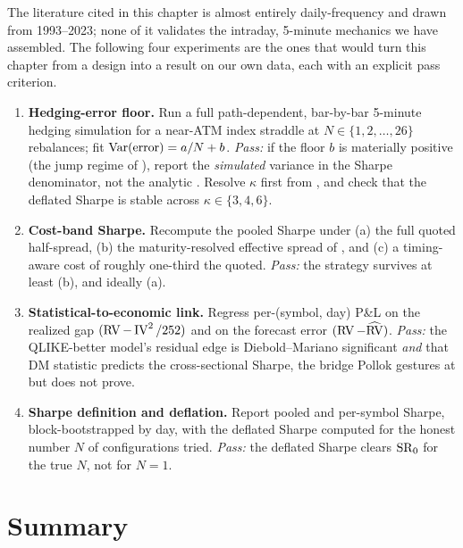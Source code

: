 The literature cited in this chapter is almost entirely daily-frequency and drawn from 1993--2023; none of it validates the intraday, 5-minute mechanics we have assembled. The following four experiments are the ones that would turn this chapter from a design into a result on our own data, each with an explicit pass criterion.

\begin{projectconnection}
\begin{enumerate}
  \item \textbf{Hedging-error floor.} Run a full path-dependent, bar-by-bar 5-minute hedging simulation for a near-ATM index straddle at $N \in \{1, 2, \dots, 26\}$ rebalances; fit $\operatorname{Var}(\text{error}) = a/N + b$. \emph{Pass:} if the floor $b$ is materially positive (the jump regime of ), report the \emph{simulated} variance in the Sharpe denominator, not the analytic . Resolve $\kappa$ first from , and check that the deflated Sharpe is stable across $\kappa \in \{3,4,6\}$.
  \item \textbf{Cost-band Sharpe.} Recompute the pooled Sharpe under (a) the full quoted half-spread, (b) the maturity-resolved effective spread of , and (c) a timing-aware cost of roughly one-third the quoted. \emph{Pass:} the strategy survives at least (b), and ideally (a).
  \item \textbf{Statistical-to-economic link.} Regress per-(symbol, day) P\&L on the realized gap $(\operatorname{RV} - \operatorname{IV}^2/252)$ and on the forecast error $(\operatorname{RV} - \widehat{\operatorname{RV}})$. \emph{Pass:} the QLIKE-better model's residual edge is Diebold--Mariano significant \emph{and} that DM statistic predicts the cross-sectional Sharpe, the bridge Pollok gestures at but does not prove.
  \item \textbf{Sharpe definition and deflation.} Report pooled and per-symbol Sharpe, block-bootstrapped by day, with the deflated Sharpe computed for the honest number $N$ of configurations tried. \emph{Pass:} the deflated Sharpe clears $\operatorname{SR}_0$ for the true $N$, not for $N=1$.
\end{enumerate}
\end{projectconnection}

\section{Summary}
\label{sec:ivrv:summary}

